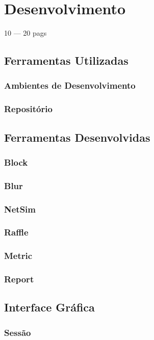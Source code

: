 
\chapter{Desenvolvimento}
10 --- 20 pags

\section{Ferramentas Utilizadas}
\subsection{Ambientes de Desenvolvimento}
\subsection{Repositório}

\section{Ferramentas Desenvolvidas}
\subsection{Block}
\subsection{Blur}
\subsection{NetSim}
\subsection{Raffle}
\subsection{Metric}
\subsection{Report}

\section{Interface Gráfica}
\subsection{Sessão}
